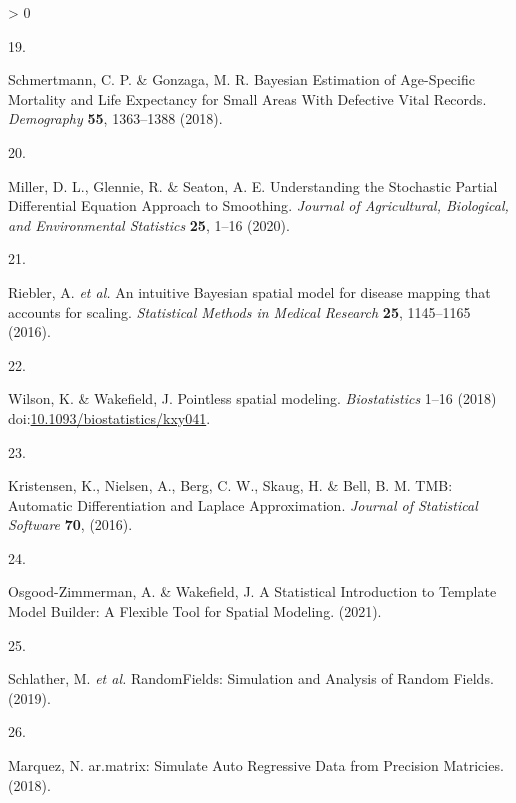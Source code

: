 \documentclass[
]{article}
\newlength{\cslhangindent}
\newlength{\csllabelwidth}
\newenvironment{CSLReferences}[2] %
 {%
  \setlength{\parindent}{0pt}
  \ifodd #1 \everypar{\setlength{\hangindent}{\cslhangindent}}\ignorespaces\fi
  \ifnum #2 > 0
  \setlength{\parskip}{#2\baselineskip}
  \fi
 }%
 {}
\newcommand{\CSLLeftMargin}[1]{\parbox[t]{\csllabelwidth}{#1}}
\newcommand{\CSLRightInline}[1]{\parbox[t]{\linewidth - \csllabelwidth}{#1}\break}
\begin{document}
\begin{CSLReferences}{0}{0}
\leavevmode\hypertarget{ref-Schmertmann2018}{}%
\CSLLeftMargin{19. }
\CSLRightInline{Schmertmann, C. P. \& Gonzaga, M. R. {Bayesian Estimation of Age-Specific Mortality and Life Expectancy for Small Areas With Defective Vital Records}. \emph{Demography} \textbf{55}, 1363--1388 (2018).}

\leavevmode\hypertarget{ref-Miller2020}{}%
\CSLLeftMargin{20. }
\CSLRightInline{Miller, D. L., Glennie, R. \& Seaton, A. E. {Understanding the Stochastic Partial Differential Equation Approach to Smoothing}. \emph{Journal of Agricultural, Biological, and Environmental Statistics} \textbf{25}, 1--16 (2020).}

\leavevmode\hypertarget{ref-Riebler2016}{}%
\CSLLeftMargin{21. }
\CSLRightInline{Riebler, A. \emph{et al.} {An intuitive Bayesian spatial model for disease mapping that accounts for scaling}. \emph{Statistical Methods in Medical Research} \textbf{25}, 1145--1165 (2016).}

\leavevmode\hypertarget{ref-Wilson2018}{}%
\CSLLeftMargin{22. }
\CSLRightInline{Wilson, K. \& Wakefield, J. {Pointless spatial modeling}. \emph{Biostatistics} 1--16 (2018) doi:\href{https://doi.org/10.1093/biostatistics/kxy041}{10.1093/biostatistics/kxy041}.}

\leavevmode\hypertarget{ref-Kristensen2016}{}%
\CSLLeftMargin{23. }
\CSLRightInline{Kristensen, K., Nielsen, A., Berg, C. W., Skaug, H. \& Bell, B. M. {TMB: Automatic Differentiation and Laplace Approximation}. \emph{Journal of Statistical Software} \textbf{70}, (2016).}

\leavevmode\hypertarget{ref-Osgood-Zimmerman2021}{}%
\CSLLeftMargin{24. }
\CSLRightInline{Osgood-Zimmerman, A. \& Wakefield, J. {A Statistical Introduction to Template Model Builder: A Flexible Tool for Spatial Modeling}. (2021).}

\leavevmode\hypertarget{ref-Schlather2019}{}%
\CSLLeftMargin{25. }
\CSLRightInline{Schlather, M. \emph{et al.} {{RandomFields}: Simulation and Analysis of Random Fields}. (2019).}

\leavevmode\hypertarget{ref-Marquez2018}{}%
\CSLLeftMargin{26. }
\CSLRightInline{Marquez, N. {ar.matrix: Simulate Auto Regressive Data from Precision Matricies}. (2018).}

\end{CSLReferences}
\end{document}
